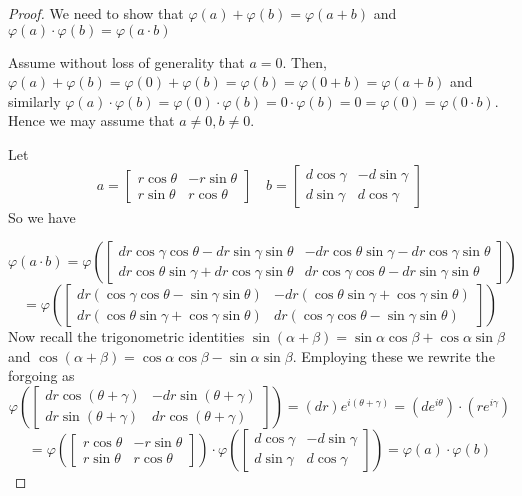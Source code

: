 \documentclass[12pt]{article}
\begin{document}
\begin{proof}We need to show that $\varphi(a)+\varphi(b)=\varphi(a+b)$ and $\varphi(a)\cdot \varphi(b)=\varphi(a\cdot b)$

Assume without loss of generality that $a=0$. Then, $\varphi(a)+\varphi(b) = \varphi(0)+\varphi(b)=\varphi(b)=\varphi(0+b)=\varphi(a+b)$ and similarly  $\varphi(a) \cdot \varphi(b) = \varphi(0) \cdot \varphi(b)= 0 \cdot \varphi(b)= 0 =\varphi(0)=\varphi(0 \cdot b)$. Hence we may assume that $a \neq 0, b \neq 0$.

Let 
\[ a = \left[ \begin{array}{lr} r \cos{\theta} & - r \sin{\theta} \\ r \sin{\theta} & r \cos{\theta} \end{array} \right]   \quad b = \left[ \begin{array}{lr} d \cos{\gamma} & - d \sin{\gamma} \\ d \sin{\gamma} & d \cos{\gamma} \end{array} \right]   \]
So we have 

\[\varphi(a\cdot b) = \varphi \left( \left[
\begin{array}{cc} d r \cos{\gamma } \cos{\theta } -d r \sin{\gamma } \sin{\theta } & -d r \cos{\theta } \sin{\gamma }-d r \cos{\gamma } \sin{\theta } \\
 d r \cos{\theta } \sin{\gamma} +d r \cos{\gamma } \sin{\theta } & d r \cos{\gamma } \cos{\theta }-d r \sin{\gamma } \sin{\theta }
\end{array}
\right] \right) \]
\[= \varphi \left( \left[
\begin{array}{cc} d r  \left( \cos{\gamma } \cos{\theta } - \sin{\gamma } \sin{\theta } \right) & -dr \left(  \cos{\theta } \sin{\gamma }+ \cos{\gamma } \sin{\theta } \right) \\
 d r\left(  \cos{\theta } \sin{\gamma} + \cos{\gamma } \sin{\theta }  \right) & d r \left( \cos{\gamma } \cos{\theta }-  \sin{\gamma } \sin{\theta }\right)
\end{array}
\right] \right) \]
Now recall the trigonometric identities $\sin{(\alpha + \beta)}= \sin{\alpha} \cos{\beta}+ \cos{\alpha}\sin{\beta} $ and $\cos{(\alpha + \beta)} = \cos{\alpha} \cos{\beta} - \sin{\alpha} \sin{\beta}$. Employing these we rewrite the forgoing as 
\[ \varphi \left(  \left[
\begin{array}{cc} d r  \cos{(\theta + \gamma)} & -dr  \sin{(\theta + \gamma)}  \\
 d r \sin{(\theta + \gamma)} & d r \cos{(\theta + \gamma)}
\end{array}
\right] \right) = (d r) e^{i (\theta+ \gamma)} =\left( d e^{i \theta}\right) \cdot \left(r e^{i \gamma }\right)
\]
\[  = \varphi \left( \left[ \begin{array}{lr} r \cos{\theta} & - r \sin{\theta} \\ r \sin{\theta} & r \cos{\theta} \end{array} \right]   \right)  \cdot  \varphi \left( \left[ \begin{array}{lr} d \cos{\gamma} & - d \sin{\gamma} \\ d \sin{\gamma} & d \cos{\gamma} \end{array} \right]  \right) = \varphi(a) \cdot \varphi(b) \]


\end{proof}
\end{document}
